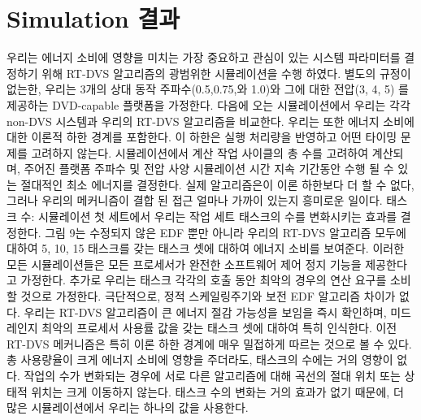 \documentclass[11pt
  , a4paper
  , article
  , oneside
]{memoir}
\begin{document}
\section{Simulation 결과}
우리는 에너지 소비에 영향을 미치는 가장 중요하고 관심이 있는 시스템 파라미터를 결정하기 위해 RT-DVS 알고리즘의 광범위한 시뮬레이션을 수행 하였다. 별도의 규정이 없는한, 우리는 3개의 상대 동작 주파수(0.5,0.75,와 1.0)와 그에 대한 전압(3, 4, 5) 를 제공하는 DVD-capable 플랫폼을 가정한다. 다음에 오는 시뮬레이션에서 우리는 각각 non-DVS 시스템과 우리의 RT-DVS 알고리즘을 비교한다. 우리는 또한 에너지 소비에 대한 이론적 하한 경계를 포함한다. 이 하한은 실행 처리량을 반영하고 어떤 타이밍 문제를 고려하지 않는다. 시뮬레이션에서 계산 작업 사이클의 총 수를 고려하여 계산되며, 주어진 플랫폼 주파수 및 전압 사양 시뮬레이션 시간 지속 기간동안 수행 될 수 있는 절대적인 최소 에너지를 결정한다. 실제 알고리즘은이 이론 하한보다 더 할 수 없다, 그러나 우리의 메커니즘이 결합 된 접근 얼마나 가까이 있는지 흥미로운 일이다.
태스크 수:
시뮬레이션 첫 세트에서 우리는 작업 세트 태스크의 수를 변화시키는 효과를 결정한다. 그림 9는 
수정되지 않은 EDF 뿐만 아니라 우리의 RT-DVS 알고리즘 모두에 대하여 5, 10, 15 태스크를 갖는 태스크 셋에 대하여 에너지 소비를 보여준다. 이러한 모든 시뮬레이션들은 모든 프로세서가 완전한 소프트웨어 제어 정지 기능을 제공한다고 가정한다. 추가로 우리는 태스크 각각의 호출 동안 최악의 경우의 연산 요구를 소비 할 것으로 가정한다. 극단적으로, 정적 스케일링주기와 보전 EDF 알고리즘 차이가 없다. 우리는 RT-DVS 알고리즘이 큰 에너지 절감 가능성을 보임을 즉시 확인하며, 미드 레인지 최악의 프로세서 사용률 값을 갖는 태스크 셋에 대하여 특히 인식한다. 이전 RT-DVS 메커니즘은 특히 이론 하한 경계에 매우 밀접하게 따르는 것으로 볼 수 있다. 총 사용량율이 크게 에너지 소비에 영향을 주더라도, 태스크의 수에는 거의 영향이 없다. 작업의 수가 변화되는 경우에 서로 다른 알고리즘에 대해 곡선의 절대 위치 또는 상태적 위치는 크게 이동하지 않는다. 태스크 수의 변화는 거의 효과가 없기 때문에, 더 많은 시뮬레이션에서 우리는 하나의 값을 사용한다.
\end{document}
